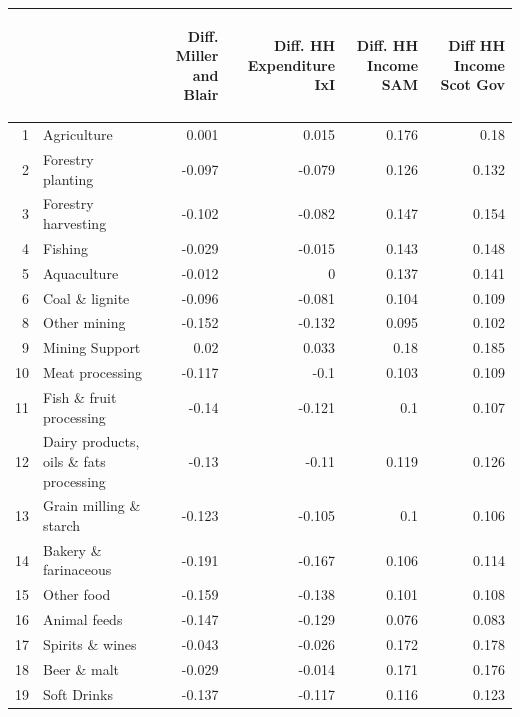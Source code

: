 \begin{longtable}{@{\extracolsep{\fill}}rlrrrr@{}}
  && \begin{sideways} Diff. Miller and Blair\end{sideways} & \begin{sideways} Diff. HH Expenditure IxI\end{sideways} & \begin{sideways} Diff. HH Income SAM\end{sideways} & \begin{sideways}Diff HH Income Scot Gov\end{sideways} \\ [0.5ex] 
    \hline 
    1     & Agriculture & 0.001 & 0.015 & 0.176 & 0.18 \\
    2     & Forestry planting & -0.097 & -0.079 & 0.126 & 0.132 \\
    3     & Forestry harvesting & -0.102 & -0.082 & 0.147 & 0.154 \\
    4     & Fishing & -0.029 & -0.015 & 0.143 & 0.148 \\
    5     & Aquaculture & -0.012 & 0     & 0.137 & 0.141 \\
    6     & Coal \& lignite & -0.096 & -0.081 & 0.104 & 0.109 \\
    8     & Other mining & -0.152 & -0.132 & 0.095 & 0.102 \\
    9     & Mining Support & 0.02  & 0.033 & 0.18  & 0.185 \\
    10    & Meat processing & -0.117 & -0.1  & 0.103 & 0.109 \\
    11    & Fish \& fruit processing & -0.14 & -0.121 & 0.1   & 0.107 \\
    12    & Dairy products, oils \& fats processing & -0.13 & -0.11 & 0.119 & 0.126 \\
    13    & Grain milling \& starch & -0.123 & -0.105 & 0.1   & 0.106 \\
    14    & Bakery \& farinaceous & -0.191 & -0.167 & 0.106 & 0.114 \\
    15    & Other food & -0.159 & -0.138 & 0.101 & 0.108 \\
    16    & Animal feeds & -0.147 & -0.129 & 0.076 & 0.083 \\
    17    & Spirits \& wines & -0.043 & -0.026 & 0.172 & 0.178 \\
    18    & Beer \& malt & -0.029 & -0.014 & 0.171 & 0.176 \\
    19    & Soft Drinks & -0.137 & -0.117 & 0.116 & 0.123 \\

\end{longtable}
